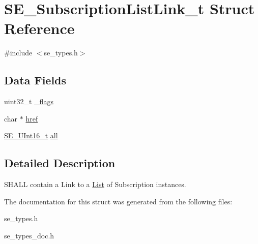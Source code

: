 \hypertarget{structSE__SubscriptionListLink__t}{}\section{S\+E\+\_\+\+Subscription\+List\+Link\+\_\+t Struct Reference}
\label{structSE__SubscriptionListLink__t}


{\ttfamily \#include $<$se\+\_\+types.\+h$>$}

\subsection*{Data Fields}
\begin{DoxyCompactItemize}
\item 
uint32\+\_\+t \hyperlink{group__SubscriptionListLink_ga93d00f33f2e0e65549237fbf178db546}{\+\_\+flags}
\item 
char $\ast$ \hyperlink{group__SubscriptionListLink_ga6a3870736e354e4a3b367859752e47e7}{href}
\item 
\hyperlink{group__UInt16_gac68d541f189538bfd30cfaa712d20d29}{S\+E\+\_\+\+U\+Int16\+\_\+t} \hyperlink{group__SubscriptionListLink_gac6bb6b67f2a885facd387ad84674a74b}{all}
\end{DoxyCompactItemize}


\subsection{Detailed Description}
S\+H\+A\+LL contain a Link to a \hyperlink{structList}{List} of Subscription instances. 

The documentation for this struct was generated from the following files\+:\begin{DoxyCompactItemize}
\item 
se\+\_\+types.\+h\item 
se\+\_\+types\+\_\+doc.\+h\end{DoxyCompactItemize}
